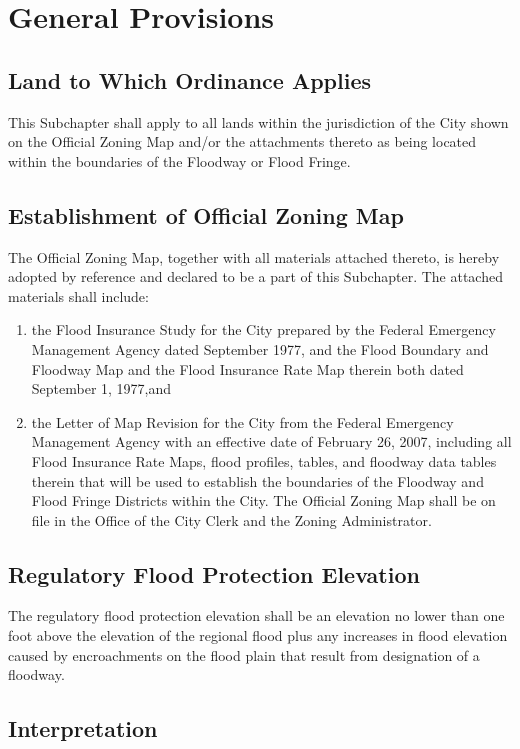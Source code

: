 \section{General Provisions}
\subsection{Land to Which Ordinance Applies}
This Subchapter shall apply to all lands within the jurisdiction of the City shown on the Official Zoning Map and/or the attachments thereto as being located within the boundaries of the Floodway or Flood Fringe.
\subsection{Establishment of Official Zoning Map}
The Official Zoning Map, together with all materials attached thereto, is hereby adopted by reference and declared to be a part of this Subchapter. The attached materials shall include:
\begin{enumerate}[{\indent}1)]
    \item the Flood Insurance Study for the City prepared by the Federal Emergency Management Agency dated September 1977, and the Flood Boundary and Floodway Map and the Flood Insurance Rate Map therein both dated September 1, 1977,and
    \item the Letter of Map Revision for the City from the Federal Emergency Management Agency with an effective date of February 26, 2007, including all Flood Insurance Rate Maps, flood profiles, tables, and floodway data tables therein that will be used to establish the boundaries of the Floodway and Flood Fringe Districts within the City. The Official Zoning Map shall be on file in the Office of the City Clerk and the Zoning Administrator.
\end{enumerate}
\subsection{Regulatory Flood Protection Elevation}
The regulatory flood protection elevation shall be an elevation no lower than one foot above the elevation of the regional flood plus any increases in flood elevation caused by encroachments on the flood plain that result from designation of a floodway.
\subsection{Interpretation}
